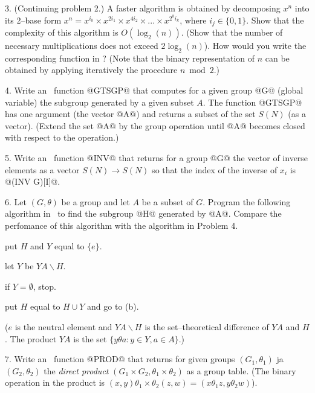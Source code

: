 \bigskip

\item{3.} (Continuing problem 2.) A faster algorithm is obtained by
          decomposing $x^n$ into its 2--base form
          $x^n = x^{i_0}\times x^{2i_1}\times
          x^{4i_2}\times ... \times x^{{2^k}i_k}$, where $i_j\in\{0,1\}$. Show
          that the complexity of this algorithm is $O(\log_2(n))$.
          (Show that the number of necessary multiplications does
          not exceed $2\log_2(n)$). How would you write the corresponding
          function in \APL? (Note that the binary representation of $n$
          can be obtained by applying iteratively the procedure $n\bmod 2$.)

\bigskip

\item{4.} Write an \APL\ function @GTSGP@ that computes for a given group @G@
          (global variable) the subgroup generated by a given subset $A$. The
          function @GTSGP@ has one argument (the vector @A@) and returns
          a subset of the set $S(N)$ (as a vector). (Extend the set @A@
          by the group operation until @A@ becomes closed with respect
          to the operation.)

\bigskip

\item{5.} Write an \APL\ function @INV@ that returns for a group @G@
          the vector of inverse elements as a vector $S(N)\to S(N)$ so
          that the index of the inverse of $x_i$ is @(INV G)[I]@.

\bigskip

\item{6.} Let $(G,\theta)$ be a group and let $A$ be a subset of $G$. Program
          the following algorithm in \APL\ to find the subgroup @H@
          generated by @A@. Compare the perfomance of this algorithm
          with the algorithm in Problem 4.
          \medskip

           put $H$ and $Y$ equal to $\{e\}$.

           let $Y$ be $YA\smallsetminus H$.

           if $Y=\emptyset$, stop.

           put $H$ equal to $H\cup Y$ and
                        go to (b).

          \medskip
\item{}     ($e$ is the neutral element and $YA\smallsetminus H$
           is the set--theoretical difference of $YA$ and $H$.
           The product $YA$ is the set $\{y\theta a: y\in Y, a\in A\}$.)

\bigskip

\item{7.} Write an \APL\ function @PROD@ that returns for given groups
          $(G_1,\theta_1)$ ja $(G_2,\theta_2)$ the {\sl direct product}
          $(G_1\times G_2,\theta_1\times\theta_2)$ as a group table.
          (The binary operation in the product is $(x,y)\theta_1\times\theta_2
          (z,w) = (x\theta_1 z,y\theta_2 w)$).

\bigskip

\vfill\eject
